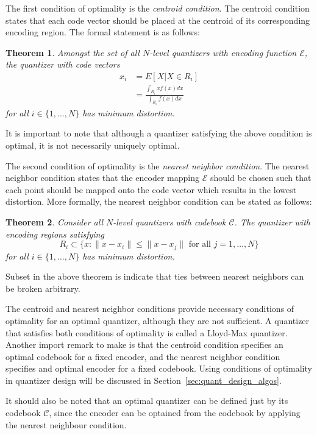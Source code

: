 \documentclass[10pt]{article}
\newtheorem{theorem}{Theorem}[section]
\begin{document}
The first condition of optimality is the \emph{centroid condition}. The centroid condition states that each code vector should be placed at the centroid of its corresponding encoding region. The formal statement is as follows:
\begin{theorem}
Amongst the set of all $N$-level quantizers with encoding function $\mathcal{E}$, the quantizer with code vectors
\begin{align}
x_i &= E[X | X \in R_i] \\
&= \frac{ \int_{R_i}xf(x)dx }{ \int_{R_i}f(x)dx }
\end{align}
for all $i \in \{1,\ldots,N\}$ has minimum distortion.
\end{theorem}
It is important to note that although a quantizer satisfying the above condition is optimal, it is not necessarily uniquely optimal.

The second condition of optimality is the \emph{nearest neighbor condition}. The nearest neighbor condition states that the encoder mapping $\mathcal{E}$ should be chosen such that each point should be mapped onto the code vector which results in the lowest distortion. More formally, the nearest neighbor condition can be stated as follows:
\begin{theorem}
Consider all $N$-level quantizers with codebook $\mathcal{C}$. The quantizer with encoding regions satisfying
\begin{equation}
R_i \subset \{x : \| x - x_i \| \le \| x - x_j \| \text{ for all } j = 1,\ldots,N \}
\end{equation}
for all $i \in \{1,\ldots,N\}$ has minimum distortion.
\end{theorem}
Subset in the above theorem is indicate that ties between nearest neighbors can be broken arbitrary.

The centroid and nearest neighbor conditions provide necessary conditions of optimality for an optimal quantizer, although they are not sufficient. A quantizer that satisfies both conditions of optimality is called a Lloyd-Max quantizer. Another import remark to make is that the centroid condition specifies an optimal codebook for a fixed encoder, and the nearest neighbor condition specifies and optimal encoder for a fixed codebook. Using conditions of optimality in quantizer design will be discussed in Section~\ref{sec:quant_design_algos}.

It should also be noted that an optimal quantizer can be defined just by its codebook $\mathcal{C}$, since the encoder can be optained from the codebook by applying the nearest neighbour condition.
\end{document}
